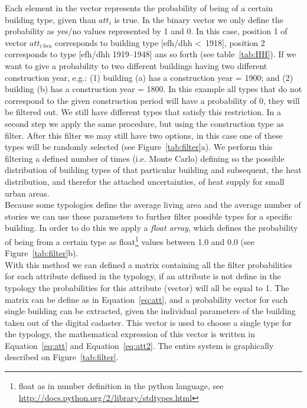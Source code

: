 \documentclass[authoryear,preprint,review,12pt]{elsarticle}
\begin{document}
\begin{linenumbers}
Each element in the vector represents the probability of being of a certain
building type, given than $att_i$ is true.  In the binary vector we only define
the probability as yes/no values represented by 1 and 0. In this case,
position 1 of vector $att_{i~bsu}$ corresponds to building type [efh/dhh
\textless~1918], position 2 corresponds to type [efh/dhh 1919--1948] ans so
forth (see table~\ref{tab:HH}).  If we want to give a probability to two
different buildings having two different construction year, e.g.: (1) building
(a) has a construction year = 1900; and (2) building (b) has a construction
year = 1800. In this example all types that do not correspond to the given
construction period will have a probability of 0, they will be filtered out.
We still have different types that satisfy this restriction. In a second step
we apply the same procedure, but using the construction type as filter. After
this filter we may still have two options, in this case one of these types will be
randomly selected (see Figure~\ref{tab:filter}a). We perform this filtering a
defined number of times (i.e. Monte Carlo) defining so the possible distribution
of building types of that particular building and subsequent, the heat
distribution, and therefor the attached uncertainties, of heat supply for small
urban areas.\\

Because some typologies define the average living area and the average
number of stories we can use these parameters to further filter possible types
for a specific building. In order to do this we apply a \textit{float array},
which defines the probability of being from a certain type as
float\footnote{float as in number definition in the python language, see
    \url{http://docs.python.org/2/library/stdtypes.html}} values between 1.0
and 0.0 (see Figure~\ref{tab:filter}b).\\

With this method we can defined a matrix containing all the filter probabilities
for each attribute defined in the typology, if an attribute is not define in
the typology the probabilities for this attribute (vector) will all be equal to
1. The matrix can be define as in Equation~\ref{eq:att}, and a probability
vector for each single building can be extracted, given the individual
parameters of the building taken out of the digital cadaster. This vector is
used to choose a single type for the typology, the mathematical expression of
this vector is written in Equation~\ref{eq:att} and Equation~\ref{eq:att2}.
The entire system is graphically described on Figure~\ref{tab:filter}.\\


\end{linenumbers}
\end{document}

